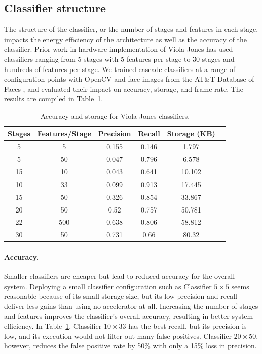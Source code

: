 \subsection{Classifier structure}
The structure of the classifier, or the number of stages and features in each stage,
impacts the energy efficiency of the architecture as well as the accuracy of the
classifier. Prior work in hardware implementation of Viola-Jones has used
classifiers ranging from 5 stages with 5 features per stage to 30 stages and
hundreds of features per stage. We trained cascade classifiers at a range of
configuration points with OpenCV and face images from
the AT\&T Database of Faces \cite{attfaces}, and evaluated their impact on accuracy, storage, and
frame rate. The results are compiled in Table~\ref{table:vj-clsfr-sizes}.

\begin{table}[h]
  \centering
\begin{tabular}{cccccc}
\hline
Stages  & Features/Stage  & Precision & Recall & Storage (KB)  \\ \hline
5       &       5         & 0.155     & 0.146  & 1.797         \\
5     &         50        & 0.047     & 0.796  & 6.578        \\
15    &         10       & 0.043     & 0.641  & 10.102     \\
10    &         33       & 0.099     & 0.913  & 17.445     \\
15    &         50       & 0.326     & 0.854  & 33.867         \\
20    &         50       & 0.52      & 0.757  & 50.781      \\
22    &         500      & 0.638     & 0.806  & 58.812     \\
30    &         50       & 0.731     & 0.66   & 80.32      \\
\hline
\end{tabular}

\caption{Accuracy and storage for Viola-Jones classifiers.}
\label{table:vj-clsfr-sizes}
\end{table}



\paragraph{Accuracy.}
Smaller classifiers are cheaper but lead to reduced accuracy
for the overall system.
Deploying a small classifier configuration such as Classifier $5\times 5$ seems reasonable
because of its small storage size, but its low
precision and recall deliver less gains than using no accelerator at all. Increasing
the number of stages and features improves the classifier's overall accuracy, resulting
in better system efficiency. In Table~\ref{table:vj-clsfr-sizes},
Classifier $10\times 33$ has the best recall, but its precision
is low, and its execution would not filter out many false positives. Classifier
$20\times 50$, however, reduces the false positive rate by 50\% with only a 15\% loss in precision.

